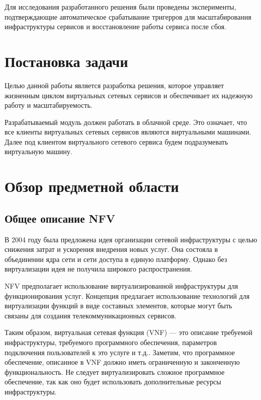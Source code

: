 \documentclass[oneside,final,14pt,a4paper]{extreport}
\begin{document}
Для исследования разработанного решения были проведены эксперименты, подтверждающие автоматическое срабатывание тригерров для масштабирования инфраструктуры сервисов и восстановление работы сервиса после сбоя.





\chapter{Постановка задачи}
\label{chap:problem_statement}
Целью данной работы является разработка решения, которое управляет жизненным циклом виртуальных сетевых сервисов и обеспечивает их надежную работу и масштабируемость.

Разрабатываемый модуль должен работать в облачной среде. Это означает, что все клиенты виртуальных сетевых сервисов являются виртуальными машинами. Далее под клиентом виртуального сетевого сервиса будем подразумевать виртуальную машину.





\chapter{Обзор предметной области}
\label{chap:overview_subject_area}

\section{Общее описание NFV}
\label{sec:nfv_description}
В 2004 году была предложена идея организации сетевой инфраструктуры с целью снижения затрат и ускорения внедрения новых услуг. Она состояла в объединении ядра сети и сети доступа в единую платформу. Однако без виртуализации идея не получила широкого распространения.\cite{nfv-state2}

NFV предполагает использование виртуализированной инфраструктуры для функционирования услуг. Концепция предлагает использование технологий для виртуализации функций в виде составных элементов, которые могут быть связаны для создания телекоммуникационных сервисов. 

Таким образом, виртуальная сетевая функция (VNF) --- это описание требуемой инфраструктуры, требуемого программного обеспечения, параметров подключения пользователей к это услуге и т.д.. Заметим, что программное обеспечение, описанное в VNF должно иметь ограниченную и законченную функциональность. Не следует виртуализировать сложное программное обеспечение, так как оно будет использовать дополнительные ресурсы инфраструктуры.
\end{document}
